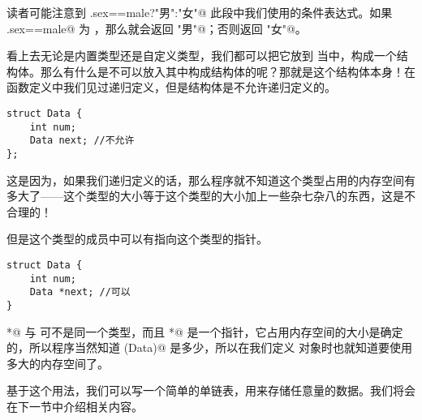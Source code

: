 读者可能注意到 \lstinline@person.sex==male?"男":"女"@ 此段中我们使用的条件表达式。如果 \lstinline@person.sex==male@ 为 \lstinline@true@，那么就会返回 \lstinline@"男"@；否则返回 \lstinline@"女"@。\par
看上去无论是内置类型还是自定义类型，我们都可以把它放到 \lstinline@struct@ 当中，构成一个结构体。那么有什么是不可以放入其中构成结构体的呢？那就是这个结构体本身！在函数定义中我们见过递归定义，但是结构体是不允许递归定义的。
\begin{lstlisting}
struct Data {
    int num;
    Data next; //不允许
};
\end{lstlisting}
这是因为，如果我们递归定义的话，那么程序就不知道这个类型占用的内存空间有多大了——这个类型的大小等于这个类型的大小加上一些杂七杂八的东西，这是不合理的！\par
但是这个类型的成员中可以有指向这个类型的指针。
\begin{lstlisting}
struct Data {
    int num;
    Data *next; //可以
}
\end{lstlisting}
\lstinline@Data*@ 与 \lstinline@Data@ 可不是同一个类型，而且 \lstinline@Data*@ 是一个指针，它占用内存空间的大小是确定的，所以程序当然知道 \lstinline@sizeof(Data)@ 是多少，所以在我们定义 \lstinline@Data@ 对象时也就知道要使用多大的内存空间了。\par
基于这个用法，我们可以写一个简单的单链表，用来存储任意量的数据。我们将会在下一节中介绍相关内容。\par
